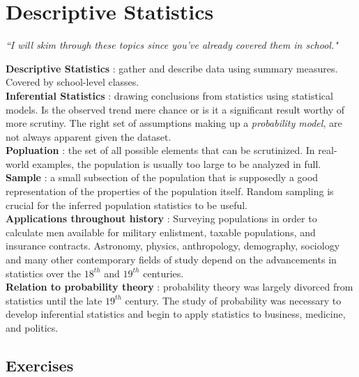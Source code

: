 \chapter{Descriptive Statistics}


\begin{flushright}
	\textit{``I will skim through these topics since you've already covered them in school."} \\
\end{flushright}

\textbf{Descriptive Statistics} : gather and describe data using summary measures. Covered by school-level classes. \\

\textbf{Inferential Statistics} : drawing conclusions from statistics using statistical models. Is the observed trend mere chance or is it a significant result worthy of more scrutiny. The right set of assumptions making up a \textit{probability model}, are not always apparent given the dataset. \\

\textbf{Popluation} : the set of all possible elements that can be scrutinized. In real-world examples, the population is usually too large to be analyzed in full. \\

\textbf{Sample} : a small subsection of the population that is supposedly a good representation of the properties of the population itself. Random sampling is crucial for the inferred population statistics to be useful. \\

\textbf{Applications throughout history} : Surveying populations in order to calculate men available for military enlistment, taxable populations, and insurance contracts. Astronomy, physics, anthropology, demography, sociology and many other contemporary fields of study depend on the advancements in statistics over the $ 18^{th} $ and $19^{th}$ centuries. \\

\textbf{Relation to probability theory} : probability theory was largely divorced from statistics until the late $ 19^{th} $ century. The study of probability was necessary to develop inferential statistics and begin to apply statistics to business, medicine, and politics. \\

\newpage

\section*{Exercises}

